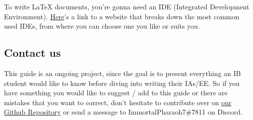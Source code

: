 To write \LaTeX{} documents, you're gonna need an IDE (Integrated Development Environment).
\href{https://beebom.com/best-latex-editors/}{Here}'s a link to a website that breaks down the most common used IDEs,
from where you can choose one you like or suits you.

\subsection{Contact us}
This guide is an ongoing project,
since the goal is to present everything an IB student would like to know before diving into writing their IAs/EE.
So if you have something you would like to suggest / add to this guide
or there are mistakes that you want to correct,
don't hesitate to contribute over on \href{https://github.com/ImmortalPharaoh7/Latex-For-The-IB}{our Github Repository}
or send a message to ImmortalPharaoh7\#7811 on Discord.